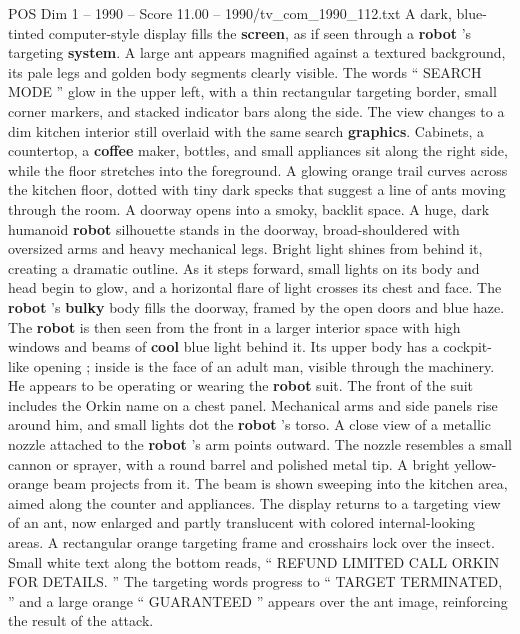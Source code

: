 \begin{textsample}{POS Dim 1 – 1990 – Score 11.00 – 1990/tv\_com\_1990\_112.txt}  \label{ex:f1_pos_042}
A dark, blue-tinted computer-style display fills the \textbf{screen}, as if seen through a \textbf{robot} ’s targeting \textbf{system}.
A large ant appears magnified against a textured background, its pale legs and golden body segments clearly visible.
The words “ SEARCH MODE ” glow in the upper left, with a thin rectangular targeting border, small corner markers, and stacked indicator bars along the side.
The view changes to a dim kitchen interior still overlaid with the same search \textbf{graphics}.
Cabinets, a countertop, a \textbf{coffee} maker, bottles, and small appliances sit along the right side, while the floor stretches into the foreground.
A glowing orange trail curves across the kitchen floor, dotted with tiny dark specks that suggest a line of ants moving through the room.
A doorway opens into a smoky, backlit space.
A huge, dark humanoid \textbf{robot} silhouette stands in the doorway, broad-shouldered with oversized arms and heavy mechanical legs.
Bright light shines from behind it, creating a dramatic outline.
As it steps forward, small lights on its body and head begin to glow, and a horizontal flare of light crosses its chest and face.
The \textbf{robot} ’s \textbf{bulky} body fills the doorway, framed by the open doors and blue haze.
The \textbf{robot} is then seen from the front in a larger interior space with high windows and beams of \textbf{cool} blue light behind it.
Its upper body has a cockpit-like opening ; inside is the face of an adult man, visible through the machinery.
He appears to be operating or wearing the \textbf{robot} suit.
The front of the suit includes the Orkin name on a chest panel.
Mechanical arms and side panels rise around him, and small lights dot the \textbf{robot} ’s torso.
A close view of a metallic nozzle attached to the \textbf{robot} ’s arm points outward.
The nozzle resembles a small cannon or sprayer, with a round barrel and polished metal tip.
A bright yellow-orange beam projects from it.
The beam is shown sweeping into the kitchen area, aimed along the counter and appliances.
The display returns to a targeting view of an ant, now enlarged and partly translucent with colored internal-looking areas.
A rectangular orange targeting frame and crosshairs lock over the insect.
Small white text along the bottom reads, “ REFUND LIMITED CALL ORKIN FOR DETAILS. ” The targeting words progress to “ TARGET TERMINATED, ” and a large orange “ GUARANTEED ” appears over the ant image, reinforcing the result of the attack.

\end{textsample}
